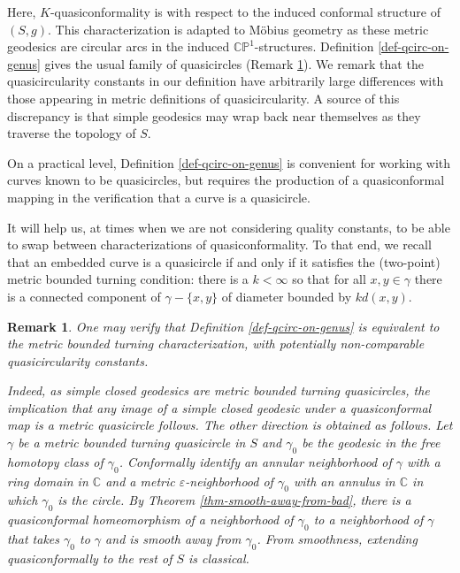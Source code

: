 \documentclass[12pt,a4paper]{amsart}
\theoremstyle{definition}
\theoremstyle{plain}
\newtheorem{remark}{Remark}
\numberwithin{equation}{section}
\begin{document}
Here, $K$-quasiconformality is with respect to the induced conformal structure of $(S,g)$.
This characterization is adapted to M\"obius geometry as these metric geodesics are circular arcs in the induced $\mathbb{CP}^1$-structures. 
Definition \ref{def-qcirc-on-genus} gives the usual family of quasicircles (Remark \ref{remark-def-well-behaved}).
We remark that the quasicircularity constants in our definition have arbitrarily large differences with those appearing in metric definitions of quasicircularity.
A source of this discrepancy is that simple geodesics may wrap back near themselves as they traverse the topology of $S$.

On a practical level, Definition \ref{def-qcirc-on-genus} is convenient for working with curves known to be quasicircles, but requires the production of a quasiconformal mapping in the verification that a curve is a quasicircle.

It will help us, at times when we are not considering quality constants, to be able to swap between characterizations of quasiconformality.
To that end, we recall that an embedded curve is a quasicircle if and only if it satisfies the (two-point) metric bounded turning condition: there is a $k< \infty$ so that for all $x,y \in \gamma$ there is a connected component of $\gamma - \{x,y\} $ of diameter bounded by $kd(x,y)$.

\begin{remark}\label{remark-def-well-behaved}
    One may verify that Definition \ref{def-qcirc-on-genus} is equivalent to the metric bounded turning characterization, with potentially non-comparable quasicircularity constants.
    
    Indeed, as simple closed geodesics are metric bounded turning quasicircles, the implication that any image of a simple closed geodesic under a quasiconformal map is a metric quasicircle follows.
    The other direction is obtained as follows.
    Let $\gamma$ be a metric bounded turning quasicircle in $S$ and $\gamma_0$ be the geodesic in the free homotopy class of $\gamma_0$.
    Conformally identify an annular neighborhood of $\gamma$ with a ring domain in $\mathbb{C}$ and a metric $\varepsilon$-neighborhood of $\gamma_0$ with an annulus in $\mathbb{C}$ in which $\gamma_0$ is the circle.
    By Theorem \ref{thm-smooth-away-from-bad}, there is a quasiconformal homeomorphism of a neighborhood of $\gamma_0$ to a neighborhood of $\gamma$ that takes $\gamma_0$ to $\gamma$ and is smooth away from $\gamma_0$.
    From smoothness, extending quasiconformally to the rest of $S$ is classical.
\end{remark}
\end{document}
